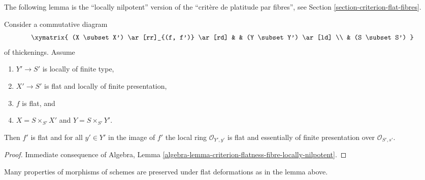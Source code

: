 \noindent
The following lemma is the ``locally nilpotent'' version of the
``crit\`ere de platitude par fibres'', see
Section \ref{section-criterion-flat-fibres}.

\begin{lemma}
\label{lemma-flatness-morphism-thickenings-fp-over-ft}
Consider a commutative diagram
$$
\xymatrix{
(X \subset X') \ar[rr]_{(f, f')} \ar[rd] & & (Y \subset Y') \ar[ld] \\
& (S \subset S')
}
$$
of thickenings. Assume
\begin{enumerate}
\item $Y' \to S'$ is locally of finite type,
\item $X' \to S'$ is flat and locally of finite presentation,
\item $f$ is flat, and
\item $X = S \times_{S'} X'$ and $Y = S \times_{S'} Y'$.
\end{enumerate}
Then $f'$ is flat and for all $y' \in Y'$ in the image of $f'$
the local ring $\mathcal{O}_{Y', y'}$ is
flat and essentially of finite presentation over $\mathcal{O}_{S', s'}$.
\end{lemma}

\begin{proof}
Immediate consequence of
Algebra, Lemma \ref{algebra-lemma-criterion-flatness-fibre-locally-nilpotent}.
\end{proof}

\noindent
Many properties of morphisms of schemes are preserved under flat
deformations as in the lemma above.

